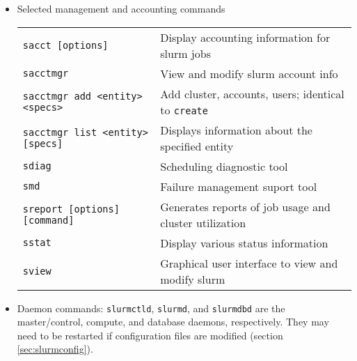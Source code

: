 \begin{itemize}
\item Selected management and accounting commands \\
\begin{tabular}{l p{3.4in}}
  \texttt{sacct [options]} & Display accounting information for slurm jobs \\
  \texttt{sacctmgr}                      & View and modify slurm account info \\
  \texttt{sacctmgr add <entity> <specs>} & Add cluster, accounts, users; identical to \texttt{create} \\
  \texttt{sacctmgr list <entity> [specs]} & Displays information about the specified entity\\
  \texttt{sdiag}                         & Scheduling diagnostic tool \\
  \texttt{smd}                           & Failure management suport tool \\
  \texttt{sreport [options] [command]}   & Generates reports of job usage and cluster utilization \\
  \texttt{sstat}                         & Display various status information \\
  \texttt{sview}                         & Graphical user interface to view and modify slurm \\
\end{tabular}


\item Daemon commands: \texttt{slurmctld}, \texttt{slurmd}, and \texttt{slurmdbd} are the master/control, compute, and database daemons, respectively. They may need to be restarted if configuration files are modified (section \ref{sec:slurmconfig}). \\


\end{itemize}
